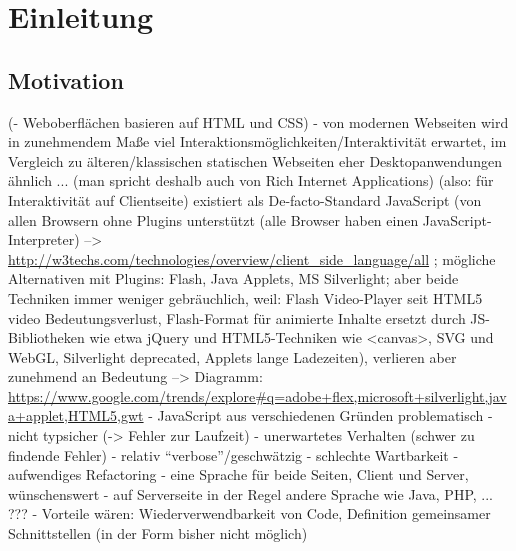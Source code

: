 \documentclass[a4paper, 12pt, listof=totoc, bibliography=totoc]{scrreprt}
\begin{document}



\tableofcontents

\newpage

\pagestyle{scrheadings}




\chapter{Einleitung}


\section{Motivation}


(- Weboberflächen basieren auf HTML und CSS)
- von modernen Webseiten wird in zunehmendem Maße viel Interaktionsmöglichkeiten/Interaktivität erwartet, im Vergleich zu älteren/klassischen statischen Webseiten eher Desktopanwendungen ähnlich ... (man spricht deshalb auch von Rich Internet Applications) (also: für Interaktivität auf Clientseite) existiert als De-facto-Standard JavaScript (von allen Browsern ohne Plugins unterstützt (alle Browser haben einen JavaScript-Interpreter)
-->  \url{http://w3techs.com/technologies/overview/client_side_language/all}
; mögliche Alternativen mit Plugins: Flash, Java Applets, MS Silverlight; aber beide Techniken immer weniger gebräuchlich, weil: Flash Video-Player seit HTML5 video Bedeutungsverlust, Flash-Format für animierte Inhalte ersetzt durch JS-Bibliotheken wie etwa jQuery und HTML5-Techniken wie <canvas>, SVG und WebGL, Silverlight deprecated, Applets lange Ladezeiten), verlieren aber zunehmend an Bedeutung  -->  Diagramm:   \url{https://www.google.com/trends/explore#q=adobe+flex,microsoft+silverlight,java+applet,HTML5,gwt}
- JavaScript aus verschiedenen Gründen problematisch
  - nicht typsicher (-> Fehler zur Laufzeit)
  - unerwartetes Verhalten (schwer zu findende Fehler)
  - relativ "`verbose"'/geschwätzig
  - schlechte Wartbarkeit
  - aufwendiges Refactoring
- eine Sprache für beide Seiten, Client und Server, wünschenswert
  - auf Serverseite in der Regel andere Sprache wie Java, PHP, ... ???
  - Vorteile wären: Wiederverwendbarkeit von Code, Definition gemeinsamer Schnittstellen (in der Form bisher nicht möglich)
\end{document}
